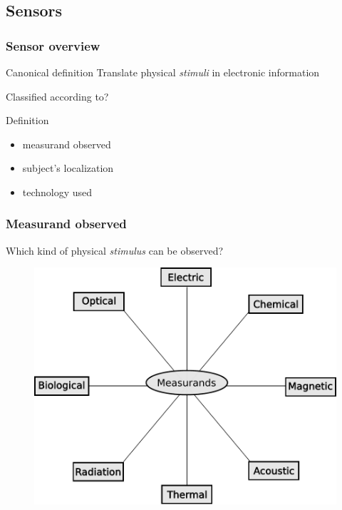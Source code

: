 \documentclass{beamer}
\begin{document}
\subsection{Sensors}

	\begin{frame}
		\frametitle{Sensor overview}
	
		\begin{block}{Canonical definition}
			Translate physical \textit{stimuli} in electronic information
		\end{block}
	
		Classified according to?	
		\begin{block}{Definition}
			\begin{itemize}
			\item measurand observed
			\item subject's localization
			\item technology used
			\end{itemize}
		\end{block}			
	
	\end{frame}

	\begin{frame}
		\frametitle{Measurand observed}
		Which kind of physical \textit{stimulus} can be observed?
		\begin{figure}[h]
			\center
			\includegraphics[scale=0.4]{../img/fig:sensors}
		 \end{figure}				
	\end{frame}
	
\end{document}
